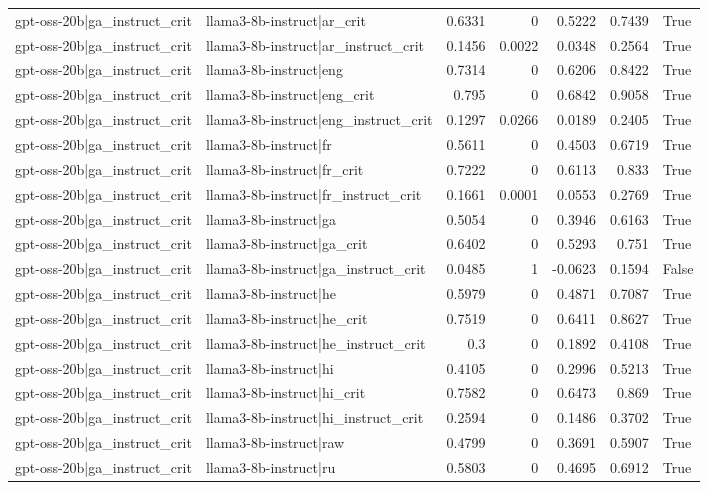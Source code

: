 \begin{table}
\begin{tabular}{l l r r r r l}
gpt-oss-20b|ga_instruct_crit & llama3-8b-instruct|ar_crit & 0.6331 & 0 & 0.5222 & 0.7439 & True \\
gpt-oss-20b|ga_instruct_crit & llama3-8b-instruct|ar_instruct_crit & 0.1456 & 0.0022 & 0.0348 & 0.2564 & True \\
gpt-oss-20b|ga_instruct_crit & llama3-8b-instruct|eng & 0.7314 & 0 & 0.6206 & 0.8422 & True \\
gpt-oss-20b|ga_instruct_crit & llama3-8b-instruct|eng_crit & 0.795 & 0 & 0.6842 & 0.9058 & True \\
gpt-oss-20b|ga_instruct_crit & llama3-8b-instruct|eng_instruct_crit & 0.1297 & 0.0266 & 0.0189 & 0.2405 & True \\
gpt-oss-20b|ga_instruct_crit & llama3-8b-instruct|fr & 0.5611 & 0 & 0.4503 & 0.6719 & True \\
gpt-oss-20b|ga_instruct_crit & llama3-8b-instruct|fr_crit & 0.7222 & 0 & 0.6113 & 0.833 & True \\
gpt-oss-20b|ga_instruct_crit & llama3-8b-instruct|fr_instruct_crit & 0.1661 & 0.0001 & 0.0553 & 0.2769 & True \\
gpt-oss-20b|ga_instruct_crit & llama3-8b-instruct|ga & 0.5054 & 0 & 0.3946 & 0.6163 & True \\
gpt-oss-20b|ga_instruct_crit & llama3-8b-instruct|ga_crit & 0.6402 & 0 & 0.5293 & 0.751 & True \\
gpt-oss-20b|ga_instruct_crit & llama3-8b-instruct|ga_instruct_crit & 0.0485 & 1 & -0.0623 & 0.1594 & False \\
gpt-oss-20b|ga_instruct_crit & llama3-8b-instruct|he & 0.5979 & 0 & 0.4871 & 0.7087 & True \\
gpt-oss-20b|ga_instruct_crit & llama3-8b-instruct|he_crit & 0.7519 & 0 & 0.6411 & 0.8627 & True \\
gpt-oss-20b|ga_instruct_crit & llama3-8b-instruct|he_instruct_crit & 0.3 & 0 & 0.1892 & 0.4108 & True \\
gpt-oss-20b|ga_instruct_crit & llama3-8b-instruct|hi & 0.4105 & 0 & 0.2996 & 0.5213 & True \\
gpt-oss-20b|ga_instruct_crit & llama3-8b-instruct|hi_crit & 0.7582 & 0 & 0.6473 & 0.869 & True \\
gpt-oss-20b|ga_instruct_crit & llama3-8b-instruct|hi_instruct_crit & 0.2594 & 0 & 0.1486 & 0.3702 & True \\
gpt-oss-20b|ga_instruct_crit & llama3-8b-instruct|raw & 0.4799 & 0 & 0.3691 & 0.5907 & True \\
gpt-oss-20b|ga_instruct_crit & llama3-8b-instruct|ru & 0.5803 & 0 & 0.4695 & 0.6912 & True \\

\end{tabular}
\end{table}
